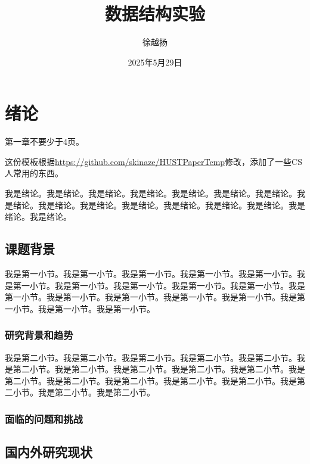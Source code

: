 \documentclass[supercite]{Experimental_Report}
\title{数据结构实验}
\author{徐越扬}
\date{2025年5月29日}
\theoremstyle{definition}
\begin{document}
\maketitle


\clearpage




\tableofcontents[level=2]
\clearpage


\section{绪论}

第一章不要少于4页。

这份模板根据\url{https://github.com/skinaze/HUSTPaperTemp}\cite{ski17}修改，添加了一些CS人常用的东西\cite{baf96}。

我是绪论。我是绪论。我是绪论。我是绪论。我是绪论。我是绪论。我是绪论。我是绪论。我是绪论。我是绪论。我是绪论。我是绪论。我是绪论。我是绪论。我是绪论。我是绪论。

\subsection{课题背景}

我是第一小节。我是第一小节。我是第一小节。我是第一小节。我是第一小节。我是第一小节。我是第一小节。我是第一小节。我是第一小节。我是第一小节。我是第一小节。我是第一小节。我是第一小节。我是第一小节。我是第一小节。我是第一小节。我是第一小节。我是第一小节。

\subsubsection{研究背景和趋势}

我是第二小节。我是第二小节。我是第二小节。我是第二小节。我是第二小节。我是第二小节。我是第二小节。我是第二小节。我是第二小节。我是第二小节。我是第二小节。我是第二小节。我是第二小节。我是第二小节。我是第二小节。我是第二小节。我是第二小节。我是第二小节。

\subsubsection{面临的问题和挑战}

\subsection{国内外研究现状}
\end{document}

